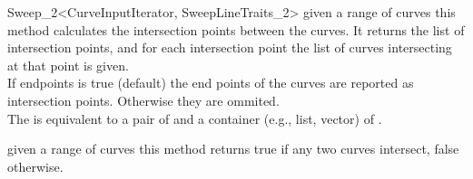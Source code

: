 \begin{ccRefClass}{Sweep_2<CurveInputIterator, SweepLineTraits_2>}
{given a range of curves this method calculates the intersection points
between the curves. It returns the list of intersection points,
and for each intersection point the list of curves intersecting
at that point is given. 
\\If endpoints is true (default) the end points
of the curves are reported as intersection points. Otherwise they are 
ommited.
\\The {} is equivalent to a pair of 
 and a container (e.g., list, vector) of .}
 

{given a range of curves this method returns true if any two curves intersect,
false otherwise.}

\end{ccRefClass}

\ccRefPageEnd
